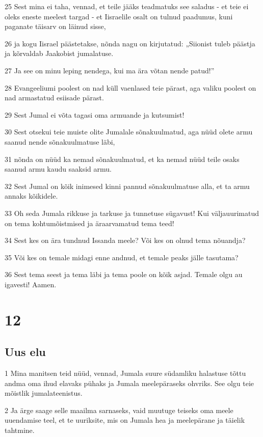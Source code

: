\par 25 Sest mina ei taha, vennad, et teile jääks teadmatuks see saladus - et teie ei oleks eneste meelest targad - et Iisraelile osalt on tulnud paadumus, kuni paganate täisarv on läinud sisse,
\par 26 ja kogu Iisrael päästetakse, nõnda nagu on kirjutatud: „Siionist tuleb päästja ja kõrvaldab Jaakobist jumalatuse.
\par 27 Ja see on minu leping nendega, kui ma ära võtan nende patud!”
\par 28 Evangeeliumi poolest on nad küll vaenlased teie pärast, aga valiku poolest on nad armastatud esiisade pärast.
\par 29 Sest Jumal ei võta tagasi oma armuande ja kutsumist!
\par 30 Sest otsekui teie muiste olite Jumalale sõnakuulmatud, aga nüüd olete armu saanud nende sõnakuulmatuse läbi,
\par 31 nõnda on nüüd ka nemad sõnakuulmatud, et ka nemad nüüd teile osaks saanud armu kaudu saaksid armu.
\par 32 Sest Jumal on kõik inimesed kinni pannud sõnakuulmatuse alla, et ta armu annaks kõikidele.
\par 33 Oh seda Jumala rikkuse ja tarkuse ja tunnetuse sügavust! Kui väljauurimatud on tema kohtumõistmised ja äraarvamatud tema teed!
\par 34 Sest kes on ära tundnud Issanda meele? Või kes on olnud tema nõuandja?
\par 35 Või kes on temale midagi enne andnud, et temale peaks jälle tasutama?
\par 36 Sest tema seest ja tema läbi ja tema poole on kõik asjad. Temale olgu au igavesti! Aamen.


\chapter{12}

\section*{Uus elu}

\par 1 Mina manitsen teid nüüd, vennad, Jumala suure südamliku halastuse tõttu andma oma ihud elavaks pühaks ja Jumala meelepäraseks ohvriks. See olgu teie mõistlik jumalateenistus.
\par 2 Ja ärge saage selle maailma sarnaseks, vaid muutuge teiseks oma meele uuendamise teel, et te uuriksite, mis on Jumala hea ja meelepärane ja täielik tahtmine.

